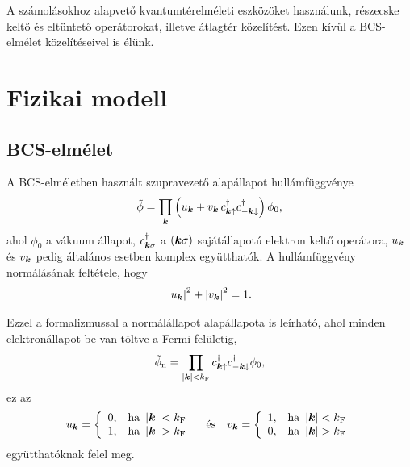 \documentclass[a4paper,12pt,titlepage]{article}
\newcommand{\KK}{{\vb*{k}}}
\begin{document}
A számolásokhoz alapvető kvantumtérelméleti eszközöket használunk, részecske keltő és eltüntető operátorokat, illetve átlagtér közelítést.  Ezen kívül a BCS-elmélet közelítéseivel is élünk.



\section{Fizikai modell}

\subsection{BCS-elmélet}

A BCS-elméletben használt szupravezető alapállapot hullámfüggvénye
\begin{equation}
	\tilde{\phi} = \prod\limits_\KK \left( u_\KK + v_\KK \, c_{\KK \uparrow}^\dagger c_{-\KK \downarrow}^\dagger \right) \phi_0,
\end{equation}
ahol $\phi_0$ a vákuum állapot, $c_{\KK \sigma}^\dagger$ a $\left( \KK \sigma \right)$ sajátállapotú elektron keltő operátora, $u_\KK$ és $v_\KK$ pedig általános esetben komplex együtthatók.  A hullámfüggvény normálásának feltétele, hogy
\begin{equation} \label{u-v-norm}
	\left| u_\KK \right|^2 + \left| v_\KK \right|^2 = 1.
\end{equation}

Ezzel a formalizmussal a normálállapot alapállapota is leírható, ahol minden elektronállapot be van töltve a Fermi-felületig,
\begin{equation}
	\tilde{\phi}_\text{n} = \prod\limits_{\left| \KK \right| < k_\text{F}} c_{\KK \uparrow}^\dagger c_{-\KK \downarrow}^\dagger \phi_0,
\end{equation}
ez az
\begin{equation}
	u_\KK = \left\{ \begin{array}{ll} 0, & \text{ha } \left| \KK \right| < k_\text{F} \\ 1, & \text{ha } \left| \KK \right| > k_\text{F} \end{array} \right.
	~~~ \text{és} ~~~
	v_\KK = \left\{ \begin{array}{ll} 1, & \text{ha } \left| \KK \right| < k_\text{F} \\ 0, & \text{ha } \left| \KK \right| > k_\text{F} \end{array} \right.
\end{equation}
együtthatóknak felel meg.
\end{document}
